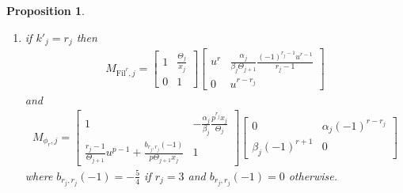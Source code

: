 \documentclass[11pt]{amsart}
\theoremstyle{definition}
\numberwithin{equation}{subsection}
\theoremstyle{plain}
\theoremstyle{plain}
\theoremstyle{plain}
\theoremstyle{plain}
\theoremstyle{plain}
\theoremstyle{plain}
\theoremstyle{plain}
\theoremstyle{plain}
\newtheorem{prop}[equation]{Proposition}
\theoremstyle{plain}
\theoremstyle{plain}
\theoremstyle{plain}
\theoremstyle{plain}
\theoremstyle{definition}
\theoremstyle{definition}
\theoremstyle{definition}
\theoremstyle{remark}
\renewcommand{\(}{\textup{(}}
\renewcommand{\)}{\textup{)}}
\newcommand{\Fil}{\mathrm{Fil}}
\begin{document}
\begin{prop}
\begin{enumerate}[leftmargin=*]
\begin{align*}
\begin{bmatrix}
        \end{bmatrix}
    \end{align*}
    and
    \begin{multline*}
    M_{\phi_r,j}
        =
        \begin{bmatrix}
            1 & p\Theta_{j+1}\frac{k_j(r_j-k_j)}{2k_j-r_j} \\
            \frac{2(r_j-k_j)(k_j-1)+r_j-1}{\Theta_{j+1}}u^{p-1}+\frac{b_{r_j,k_j}(-1)}{p\Theta_{j+1}x_j} & 1
        \end{bmatrix}\\
        \times
        \begin{bmatrix}
            0 & \alpha_j \frac{(-1)^{r-r_j}}{\binom{k_j-1}{r_j-k_j}}\\
            \beta_j (-1)^{r+1}\binom{k_j-1}{r_j-k_j} & 0
        \end{bmatrix}
    \end{multline*}
    where $b_{r_j,k_j}(-1)=-\frac{2m_j^2+2m_j+1}{m_j^2(m_j+1)^2}$ if $(r_j,k_j)=(2m_j+1,m_j+2)$ and $b_{r_j,k_j}(-1)=0$ otherwise;
\item if $k'_j=r_j$ then
    \begin{align*}
    M_{\Fil^r,j}
        =
        \begin{bmatrix}
            1 & \frac{\Theta_j}{x_j} \\
            0 & 1
        \end{bmatrix}
        \begin{bmatrix}
            u^r & \frac{\alpha_j}{\beta_j\Theta_{j+1}}\frac{(-1)^{r_j-1}u^{r-1}}{r_j-1} \\
            0 & u^{r-r_j}
        \end{bmatrix}
    \end{align*}
    and
    \begin{align*}
    M_{\phi_r,j}
        =
        \begin{bmatrix}
            1 & -\frac{\alpha_j}{\beta_j}\frac{p^{r_j}x_j}{\Theta_j} \\
            \frac{r_j-1}{\Theta_{j+1}}u^{p-1}+\frac{b_{r_j,r_j}(-1)}{p\Theta_{j+1}x_j} & 1
        \end{bmatrix}
        \begin{bmatrix}
            0 & \alpha_j (-1)^{r-r_j} \\
            \beta_j (-1)^{r+1} & 0
        \end{bmatrix}
    \end{align*}
    where $b_{r_j,r_j}(-1)=-\frac{5}{4}$ if $r_j=3$ and $b_{r_j,r_j}(-1)=0$ otherwise.
\end{enumerate}
\end{prop}
\end{document}
